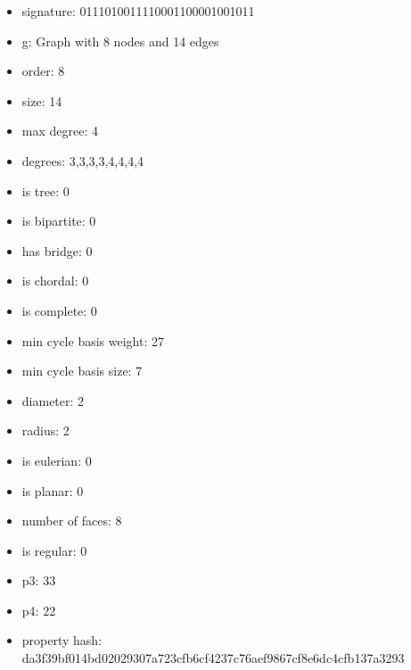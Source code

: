 \begin{itemize}
\item signature: 0111010011110001100001001011
\item g: Graph with 8 nodes and 14 edges
\item order: 8
\item size: 14
\item max degree: 4
\item degrees: 3,3,3,3,4,4,4,4
\item is tree: 0
\item is bipartite: 0
\item has bridge: 0
\item is chordal: 0
\item is complete: 0
\item min cycle basis weight: 27
\item min cycle basis size: 7
\item diameter: 2
\item radius: 2
\item is eulerian: 0
\item is planar: 0
\item number of faces: 8
\item is regular: 0
\item p3: 33
\item p4: 22
\item property hash: da3f39bf014bd02029307a723cfb6cf4237c76aef9867cf8e6dc4cfb137a3293
\end{itemize}
\newpage
\begin{figure}
\end{figure}

